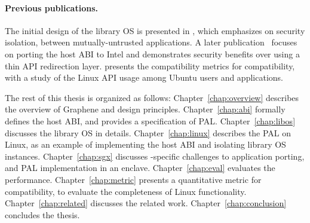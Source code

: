 \paragraph{Previous publications.}
The initial design of the \graphene{} library OS is presented in \cite{tsai14graphene}, which emphasizes on security isolation, between mutually-untrusted applications.
A later publication~\cite{tsai17graphene-sgx} focuses on porting the host ABI
to Intel \sgx{} and demonstrates security benefits 
over using a thin API redirection layer. %
\cite{tsai16apistudy} presents the compatibility metrics for compatibility,
with a study of the Linux API usage among Ubuntu users and applications.


The rest of this thesis is organized as follows:
Chapter~\ref{chap:overview} describes the overview of Graphene %
and design principles.
Chapter~\ref{chap:abi} formally defines the host ABI, and provides a specification of PAL.
Chapter~\ref{chap:libos} discusses the library OS in details.
Chapter~\ref{chap:linux} describes the PAL on Linux, as an example of implementing the host ABI and isolating library OS instances.
Chapter~\ref{chap:sgx} discusses \sgx{}-specific challenges to application porting, and PAL implementation in an enclave.
Chapter~\ref{chap:eval} evaluates the performance.
Chapter~\ref{chap:metric} presents a quantitative metric for compatibility,
to evaluate the completeness of Linux functionality.
Chapter~\ref{chap:related} discusses the related work.
Chapter~\ref{chap:conclusion} concludes the thesis.

